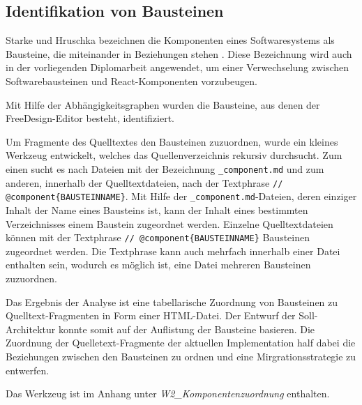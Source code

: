 

\subsection{Identifikation von Bausteinen}



Starke und Hruschka bezeichnen die Komponenten eines Softwaresystems als Bausteine, die miteinander in Beziehungen stehen \autocite[vgl.][24]{Starke2011}. Diese Bezeichnung wird auch in der vorliegenden Diplomarbeit angewendet, um einer Verwechselung zwischen Softwarebausteinen und React-Komponenten vorzubeugen.

Mit Hilfe der Abhängigkeitsgraphen wurden die Bausteine, aus denen der FreeDesign-Editor besteht, identifiziert. 

Um Fragmente des Quelltextes den Bausteinen zuzuordnen, wurde ein kleines Werkzeug entwickelt, welches das Quellenverzeichnis rekursiv durchsucht. Zum einen sucht es nach Dateien mit der Bezeichnung \glqq\lstinline|_component.md|\grqq{} und zum anderen, innerhalb der Quelltextdateien, nach der Textphrase \glqq\lstinline|// @component{BAUSTEINNAME}|\grqq{}. 
Mit Hilfe der \lstinline|_component.md|-Dateien, deren einziger Inhalt der Name eines Bausteins ist, kann der Inhalt eines bestimmten Verzeichnisses einem Baustein zugeordnet werden. Einzelne Quelltextdateien können mit der Textphrase \glqq\lstinline|// @component{BAUSTEINNAME}|\grqq{} Bausteinen zugeordnet werden. Die Textphrase kann auch mehrfach innerhalb einer Datei enthalten sein, wodurch es möglich ist, eine Datei mehreren Bausteinen zuzuordnen. 

Das Ergebnis der Analyse ist eine tabellarische Zuordnung von Bausteinen zu Quelltext-Fragmenten in Form einer HTML-Datei. 
Der Entwurf der Soll-Architektur konnte somit auf der Auflistung der Bausteine basieren. Die Zuordnung der Quelletext-Fragmente der aktuellen Implementation half dabei die Beziehungen zwischen den Bausteinen zu ordnen und eine Mirgrationsstrategie zu entwerfen.

Das Werkzeug ist im Anhang unter \emph{W2\_Komponentenzuordnung} enthalten.
